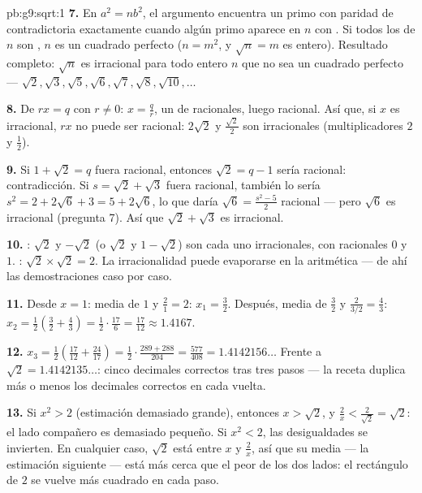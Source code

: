 \begin{solution}{pb:g9:sqrt:1}
\textbf{7.} En $a^2 = n b^2$, el argumento encuentra un primo con
paridad de  contradictoria exactamente cuando algún primo aparece en
$n$ con  \emph{}. Si todos los  de $n$ son
, $n$ es un cuadrado perfecto ($n = m^2$, y
$\sqrt n = m$ es entero). Resultado completo: $\sqrt n$ es
irracional para todo entero $n$ que no sea un cuadrado perfecto ---
$\sqrt2, \sqrt3, \sqrt5, \sqrt6, \sqrt7, \sqrt8, \sqrt{10},
\dots$

\textbf{8.} De $r x = q$ con $r \neq 0$:
$x = \frac qr$, un  de racionales, luego racional. Así que, si
$x$ es irracional, $r x$ no puede ser racional: $2\sqrt2$ y
$\frac{\sqrt2}{2}$ son irracionales (multiplicadores $2$ y
$\frac12$).

\textbf{9.} Si $1 + \sqrt2 = q$ fuera racional, entonces
$\sqrt2 = q - 1$ sería racional: contradicción. Si
$s = \sqrt2 + \sqrt3$ fuera racional, también lo sería
$s^2 = 2 + 2\sqrt6 + 3 = 5 + 2\sqrt6$, lo que daría
$\sqrt6 = \frac{s^2 - 5}{2}$ racional --- pero $\sqrt6$ es
irracional (pregunta 7). Así que $\sqrt2 + \sqrt3$ es irracional.

\textbf{10.} : $\sqrt2$ y $-\sqrt2$ (o $\sqrt2$ y
$1 - \sqrt2$) son cada uno irracionales, con  racionales $0$ y
$1$. : $\sqrt2 \times \sqrt2 = 2$. La irracionalidad puede
evaporarse en la aritmética --- de ahí las demostraciones caso por caso.

\textbf{11.} Desde $x = 1$: media de $1$ y $\frac21 = 2$:
$x_1 = \frac32$. Después, media de $\frac32$ y
$\frac{2}{3/2} = \frac43$:
$x_2 = \frac12\left(\frac32 + \frac43\right)
= \frac12 \cdot \frac{17}{6} = \frac{17}{12} \approx 1.4167$.

\textbf{12.} $x_3 = \frac12\left(\frac{17}{12} +
\frac{24}{17}\right) = \frac12 \cdot
\frac{289 + 288}{204} = \frac{577}{408} = 1.4142156\ldots$
Frente a $\sqrt2 = 1.4142135\ldots$: cinco decimales correctos tras
tres pasos --- la receta duplica más o menos los decimales correctos
en cada vuelta.

\textbf{13.} Si $x^2 > 2$ (estimación demasiado grande), entonces $x > \sqrt2$,
y $\frac2x < \frac{2}{\sqrt2} = \sqrt2$: el lado compañero es
demasiado pequeño. Si $x^2 < 2$, las desigualdades se invierten. En cualquier caso,
$\sqrt2$ está entre $x$ y $\frac2x$, así que su media ---
la estimación siguiente --- está más cerca que el peor de los dos lados:
el rectángulo de  $2$ se vuelve más cuadrado en cada paso.


\end{solution}
